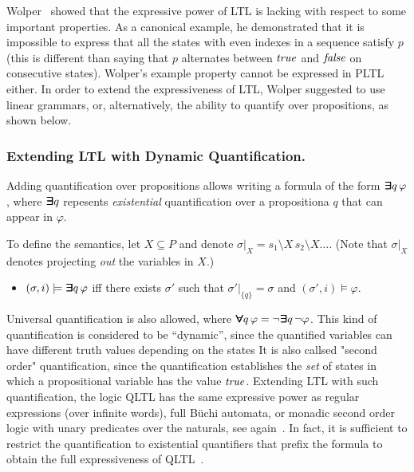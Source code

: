 Wolper~\cite{Wolper} showed that the expressive power of LTL is lacking with respect
to some important properties. As a canonical example, he demonstrated that it is impossible to
express that all the states with even indexes in a sequence
satisfy $p$ (this is
different than saying that $p$ alternates between $\mathit{true}$ and $\mathit{false}$ on consecutive states).
Wolper's example property cannot be expressed in PLTL either.
In order to extend the expressiveness of LTL, Wolper suggested to use linear grammars, or, alternatively, the ability to quantify over
propositions, as shown below.

\subsubsection{Extending LTL with Dynamic Quantification.}
Adding quantification over propositions allows writing a formula of the form
$\bm{\exists}\kern-0.6em\bm{\exists} q \, \varphi$, where
$\bm{\exists}\kern-0.6em\bm{\exists} q$ repesents {\em existential} quantification over a propositiona $q$ that can appear in $\varphi$.

To define the semantics, let $X \subseteq P$ 
and denote $\sigma |_X = s_1 \setminus X \, s_2 \setminus X \ldots$. (Note that $\sigma |_X$ denotes projecting {\em out} the variables in $X$.)



\begin{itemize}
\item $( \sigma, i ) \models \boldsymbol{\bm{\exists}\kern-0.6em\bm{\exists}} q \, \varphi$ iff there exists
$\sigma'$ such that $\sigma' |_{\{ q \} } = \sigma$ and 
$( \sigma', i) \models \varphi$.
\end{itemize}
%
%
Universal quantification is also allowed, where $\bm{\forall}\kern-0.6em\bm{\forall} q\, \varphi =
\neg \bm{\exists}\kern-0.6em\bm{\exists} q\, \neg \varphi$.
This kind of quantification is considered to be ``dynamic'', since the quantified variables can have different truth values depending on the states It is also callsed  "second order" quantification, since the quantification establishes the {\em set} of states in which a propositional variable has the value $\mathit{true}$.
Extending LTL with such quantification, the logic QLTL has the same expressive power as regular expressions (over infinite words), full B\"{u}chi
automata, or monadic second order logic with unary predicates over the naturals, see again~\cite{Thomas}.
In fact, it is sufficient to restrict the quantification to existential quantifiers that prefix the formula to obtain the full expressiveness of QLTL~\cite{Thomas}. 

